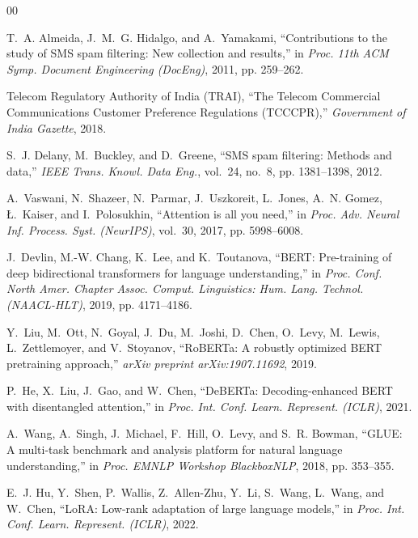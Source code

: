 \documentclass[conference]{IEEEtran}
\begin{document}
\begin{thebibliography}{00}

T.~A. Almeida, J.~M.~G. Hidalgo, and A.~Yamakami, ``Contributions to the study of SMS spam filtering: New collection and results,'' in \emph{Proc. 11th ACM Symp. Document Engineering (DocEng)}, 2011, pp. 259--262.

Telecom Regulatory Authority of India (TRAI), ``The Telecom Commercial Communications Customer Preference Regulations (TCCCPR),'' \emph{Government of India Gazette}, 2018.

S.~J. Delany, M.~Buckley, and D.~Greene, ``SMS spam filtering: Methods and data,'' \emph{IEEE Trans. Knowl. Data Eng.}, vol.~24, no.~8, pp. 1381--1398, 2012.

A.~Vaswani, N.~Shazeer, N.~Parmar, J.~Uszkoreit, L.~Jones, A.~N. Gomez, {\L}.~Kaiser, and I.~Polosukhin, ``Attention is all you need,'' in \emph{Proc. Adv. Neural Inf. Process. Syst. (NeurIPS)}, vol.~30, 2017, pp. 5998--6008.

J.~Devlin, M.-W. Chang, K.~Lee, and K.~Toutanova, ``BERT: Pre-training of deep bidirectional transformers for language understanding,'' in \emph{Proc. Conf. North Amer. Chapter Assoc. Comput. Linguistics: Hum. Lang. Technol. (NAACL-HLT)}, 2019, pp. 4171--4186.

Y.~Liu, M.~Ott, N.~Goyal, J.~Du, M.~Joshi, D.~Chen, O.~Levy, M.~Lewis, L.~Zettlemoyer, and V.~Stoyanov, ``RoBERTa: A robustly optimized BERT pretraining approach,'' \emph{arXiv preprint arXiv:1907.11692}, 2019.

P.~He, X.~Liu, J.~Gao, and W.~Chen, ``DeBERTa: Decoding-enhanced BERT with disentangled attention,'' in \emph{Proc. Int. Conf. Learn. Represent. (ICLR)}, 2021.

A.~Wang, A.~Singh, J.~Michael, F.~Hill, O.~Levy, and S.~R. Bowman, ``GLUE: A multi-task benchmark and analysis platform for natural language understanding,'' in \emph{Proc. EMNLP Workshop BlackboxNLP}, 2018, pp. 353--355.

E.~J. Hu, Y.~Shen, P.~Wallis, Z.~Allen-Zhu, Y.~Li, S.~Wang, L.~Wang, and W.~Chen, ``LoRA: Low-rank adaptation of large language models,'' in \emph{Proc. Int. Conf. Learn. Represent. (ICLR)}, 2022.


\end{thebibliography}
\end{document}
